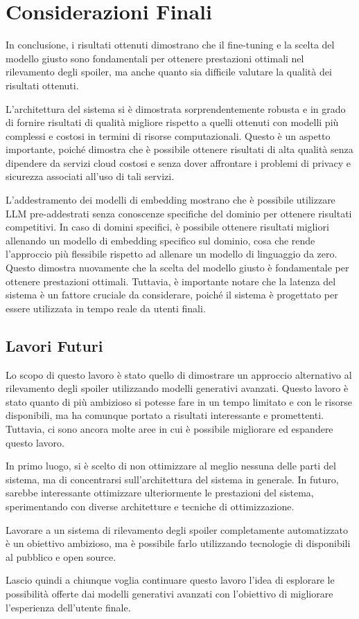 \chapter{Considerazioni Finali}
\label{ch:owari}

In conclusione, i risultati ottenuti dimostrano che il
fine-tuning e la scelta del modello giusto sono
fondamentali per ottenere prestazioni ottimali nel
rilevamento degli spoiler, ma anche quanto sia difficile
valutare la qualità dei risultati ottenuti.

L'architettura del sistema si è dimostrata
sorprendentemente robusta e in grado di fornire risultati
di qualità migliore rispetto a quelli ottenuti con modelli
più complessi e costosi in termini di risorse
computazionali.
Questo è un aspetto importante, poiché dimostra che è
possibile ottenere risultati di alta qualità senza
dipendere da servizi cloud costosi e senza dover affrontare
i problemi di privacy e sicurezza associati all'uso di tali
servizi.

L'addestramento dei modelli di embedding mostrano che è
possibile utilizzare LLM pre-addestrati senza conoscenze
specifiche del dominio per ottenere risultati competitivi.
In caso di domini specifici, è possibile ottenere risultati
migliori allenando un modello di embedding specifico sul
dominio, cosa che rende l'approccio più flessibile rispetto
ad allenare un modello di linguaggio da zero.
Questo dimostra nuovamente che la scelta del modello giusto
è fondamentale per ottenere prestazioni ottimali.
Tuttavia, è importante notare che la latenza del sistema è
un fattore cruciale da considerare, poiché il sistema è
progettato per essere utilizzata in tempo reale da utenti
finali.

\section{Lavori Futuri}
\label{sec:future-work}

Lo scopo di questo lavoro è stato quello di dimostrare un
approccio alternativo al rilevamento degli spoiler
utilizzando modelli generativi avanzati.
Questo lavoro è stato quanto di più ambizioso si potesse
fare in un tempo limitato e con le risorse disponibili, ma
ha comunque portato a risultati interessante e promettenti.
Tuttavia, ci sono ancora molte aree in cui è possibile
migliorare ed espandere questo lavoro.

In primo luogo, si è scelto di non ottimizzare al meglio
nessuna delle parti del sistema, ma di concentrarsi
sull'architettura del sistema in generale.
In futuro, sarebbe interessante ottimizzare ulteriormente
le prestazioni del sistema, sperimentando con diverse
architetture e tecniche di ottimizzazione.

Lavorare a un sistema di rilevamento degli spoiler
completamente automatizzato è un obiettivo ambizioso, ma è
possibile farlo utilizzando tecnologie di disponibili al
pubblico e open source.

Lascio quindi a chiunque voglia continuare questo lavoro
l'idea di esplorare le possibilità offerte dai modelli
generativi avanzati con l'obiettivo di migliorare
l'esperienza dell'utente finale.